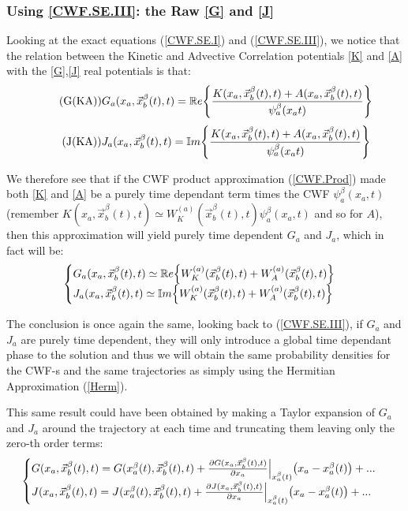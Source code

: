 \documentclass[11pt, a4paper]{article} %
\newcommand{\R}{\mathbb{R}} %
\begin{document}
\subsubsection{Using \ref{CWF.SE.III}: the Raw \ref{G} and \ref{J}}
Looking at the exact equations (\ref{CWF.SE.I}) and (\ref{CWF.SE.III}), we notice that the relation between the Kinetic and Advective Correlation potentials \ref{K} and \ref{A} with the \ref{G},\ref{J} real potentials is that:
\begin{equation}\label{G(KA)}\tag{G(KA)}
G_a(x_a,\vec{x}_b^\beta(t), t) = \mathbb{R}e\qty{\frac{K(x_a, \vec{x}_b^\beta(t), t)+A(x_a, \vec{x}_b^\beta(t), t)}{\psi_a^\beta(x_a t)}}
\end{equation}
\begin{equation}\label{J(KA)}\tag{J(KA)}
J_a(x_a,\vec{x}_b^\beta(t), t) = \mathbb{I}m\qty{\frac{K(x_a, \vec{x}_b^\beta(t), t)+A(x_a, \vec{x}_b^\beta(t), t)}{\psi_a^\beta(x_a t)}}
\end{equation}

We therefore see that if the CWF product approximation (\ref{CWF.Prod}) made both \ref{K} and \ref{A} be a purely time dependant term times the CWF $\psi_a^\beta(x_a,t)$ (remember $K(x_a, \vec{x}_b^\beta(t), t) \simeq W^{(a)}_K(\vec{x}_b^\beta (t),t)\psi_a^\beta(x_a,t)$ and so for $A$), then this approximation will yield purely time dependent $G_a$ and $J_a$, which in fact will be:
$$\begin{cases}
G_a(x_a,\vec{x}_b^\beta(t), t)\simeq \R e\qty{W^{(a)}_K(\vec{x}_b^\beta (t),t) + W^{(a)}_A(\vec{x}_b^\beta (t),t)}\\ J_a(x_a,\vec{x}_b^\beta(t), t)\simeq \mathbb{I} m\qty{W^{(a)}_K(\vec{x}_b^\beta (t),t) + W^{(a)}_A(\vec{x}_b^\beta (t),t)} \end{cases}
$$

The conclusion is once again the same, looking back to (\ref{CWF.SE.III}), if $G_a$ and $J_a$ are purely time dependent, they will only introduce a global time dependant phase to the solution and thus we will obtain the same probability densities for the CWF-s and the same trajectories as simply using the Hermitian Approximation (\ref{Herm}).

This same result could have been obtained by making a Taylor expansion of $G_a$ and $J_a$ around the trajectory at each time and truncating them leaving only the zero-th order terms:
$$\begin{cases}
G(x_a, \vec{x}_b^\beta(t), t) = G(x_a^\beta(t), \vec{x}_b^\beta(t), t) + \pdv{G(x_a, \vec{x}_b^\beta(t), t)}{x_a}\Big\rvert_{x_a^\beta(t)} \qty(x_a-x_a^\beta(t))+ ... \\
J(x_a, \vec{x}_b^\beta(t), t) = J(x_a^\beta(t), \vec{x}_b^\beta(t), t) + \pdv{J(x_a, \vec{x}_b^\beta(t), t)}{x_a}\Big\rvert_{x_a^\beta(t)} \qty(x_a-x_a^\beta(t))+ ... 
\end{cases}
$$ 
\newpage
\end{document}
